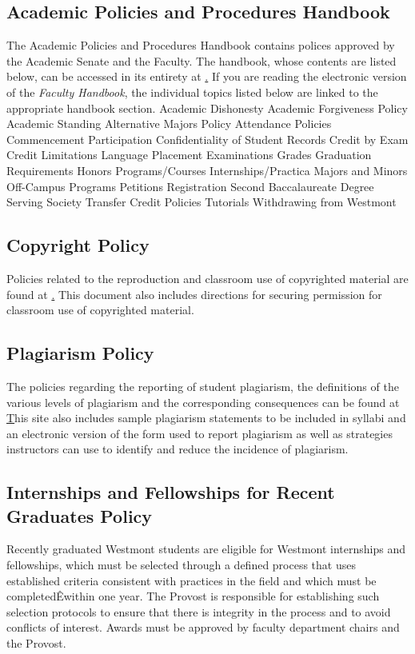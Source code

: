 \documentclass[letterpaper, 11pt]{article}
\begin{document}
	\subsection{Academic Policies and Procedures Handbook}
		The Academic Policies and Procedures Handbook contains polices approved by
		the Academic Senate and the Faculty.  The handbook, whose contents are listed
		below, can be accessed in its entirety at
		\href{http://cgi2.westmont.edu/publications/academic_policies/} .
		If you are reading the electronic version of the \emph{Faculty Handbook}, the individual topics listed below are linked to the appropriate handbook section.
		Academic Dishonesty
		Academic Forgiveness Policy
		Academic Standing
		Alternative Majors Policy
		Attendance Policies
		Commencement Participation
		Confidentiality of Student Records
		Credit by Exam
		Credit Limitations
		Language Placement
		Examinations
		Grades
		Graduation Requirements
		Honors Programs/Courses
		Internships/Practica
		Majors and Minors
		Off-Campus Programs
		Petitions
		Registration
		Second Baccalaureate Degree
		Serving Society
		Transfer Credit Policies
		Tutorials
		Withdrawing from Westmont
	\subsection{Copyright Policy}
		Policies related to the reproduction and classroom use of copyrighted
		material are found at
		\href{http://www.westmont.edu/_faculty_staff/pages/policies/copyright_policy/index.html}.
		This document also includes directions for securing permission for classroom use of copyrighted material.
	\subsection{Plagiarism Policy}
		The policies regarding the reporting of student plagiarism, the definitions
		of the various levels of plagiarism and the corresponding consequences can be
		found at
		\href{http://www.westmont.edu/_academics/pages/provost/curriculum/plagiarism/}
		This site also includes sample plagiarism statements to be included in syllabi and an electronic version of the form used to report plagiarism as well as strategies instructors can use to identify and reduce the incidence of plagiarism.
	\subsection{Internships and Fellowships for Recent Graduates Policy}
		Recently graduated Westmont students are eligible for Westmont internships and fellowships, which must be selected through a defined process that uses established criteria consistent with practices in the field and which must be completedÊwithin one year. The Provost is responsible for establishing such selection protocols to ensure that there is integrity in the process and to avoid conflicts of interest. Awards must be approved by faculty department chairs and the Provost.
\end{document}

